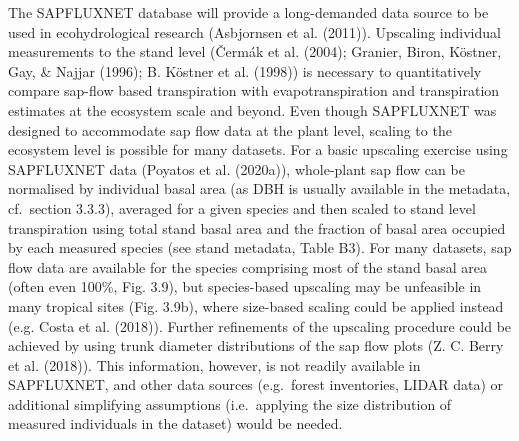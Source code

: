 \documentclass[11pt,twoside]{reedthesis}
\begin{document}
The SAPFLUXNET database will provide a long-demanded data source to be
used in ecohydrological research (Asbjornsen et al. (2011)). Upscaling
individual measurements to the stand level (Čermák et al. (2004);
Granier, Biron, Köstner, Gay, \& Najjar (1996); B. Köstner et al.
(1998)) is necessary to quantitatively compare sap-flow based
transpiration with evapotranspiration and transpiration estimates at the
ecosystem scale and beyond. Even though SAPFLUXNET was designed to
accommodate sap flow data at the plant level, scaling to the ecosystem
level is possible for many datasets. For a basic upscaling exercise
using SAPFLUXNET data (Poyatos et al. (2020a)), whole-plant sap flow can
be normalised by individual basal area (as DBH is usually available in
the metadata, cf.~section 3.3.3), averaged for a given species and then
scaled to stand level transpiration using total stand basal area and the
fraction of basal area occupied by each measured species (see stand
metadata, Table B3). For many datasets, sap flow data are available for
the species comprising most of the stand basal area (often even 100\%,
Fig. 3.9), but species-based upscaling may be unfeasible in many
tropical sites (Fig. 3.9b), where size-based scaling could be applied
instead (e.g. Costa et al. (2018)). Further refinements of the upscaling
procedure could be achieved by using trunk diameter distributions of the
sap flow plots (Z. C. Berry et al. (2018)). This information, however,
is not readily available in SAPFLUXNET, and other data sources
(e.g.~forest inventories, LIDAR data) or additional simplifying
assumptions (i.e.~applying the size distribution of measured individuals
in the dataset) would be needed.\par
\end{document}
